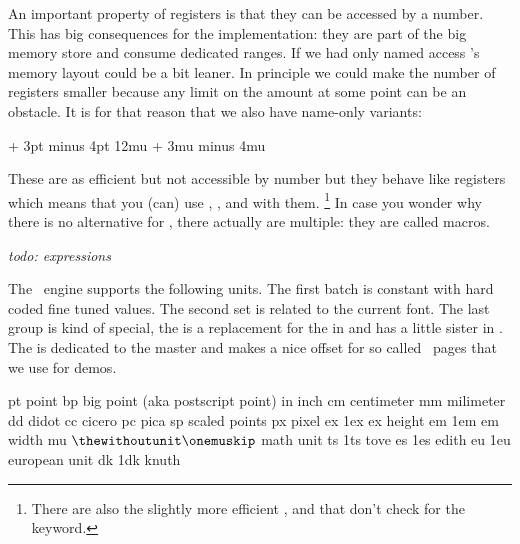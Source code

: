 An important property of registers is that they can be accessed by a number. This
has big consequences for the implementation: they are part of the big memory
store and consume dedicated ranges. If we had only named access \TEX's memory
layout could be a bit leaner. In principle we could make the number of registers
smaller because any limit on the amount at some point can be an obstacle. It is
for that reason that we also have name-only variants:

\starttyping[option=TEX]
\dimensiondef \MyDimenA   12pt
\integerdef   {}
\gluespecdef  \MyGlueA    12pt + 3pt minus 4pt
\mugluespecdef\MyMuA      12mu + 3mu minus 4mu
\stoptyping

These are as efficient but not accessible by number but they behave like
registers which means that you (can) use \type {\the}, \type {\advance}, \type
{\multiply} and \type {\divide} with them. \footnote {There are also the slightly
more efficient \type {\advanceby}, \type {\multiplyby} and \type {\divideby} that
don't check for the  keyword.} In case you wonder why there is no
alternative for \type {\toksdef}, there actually are multiple: they are called
macros.

{\em todo: expressions}

\stopsectionlevel

\startsectionlevel[title=Units]

The \LUAMETATEX\ engine supports the following units. The first batch is constant
with hard coded fine tuned values. The second set is related to the current font.
The last group is kind of special, the  is a replacement for the \type
{in} and has a little sister in . The  is dedicated to the
master and makes a nice offset for so called \TEX\ pages that we use for demos.

\starttabulate[|Tl|Tr|l|]
\FL
\NC pt \NC \thewithoutunit{} \NC point \NC \NR
\NC bp \NC \thewithoutunit{} \NC big point (aka postscript point) \NC \NR
\NC in \NC \thewithoutunit{} \NC inch \NC \NR
\NC cm \NC \thewithoutunit{} \NC centimeter \NC \NR
\NC mm \NC \thewithoutunit{} \NC milimeter \NC \NR
\NC dd \NC \thewithoutunit{} \NC didot \NC \NR
\NC cc \NC \thewithoutunit{} \NC cicero \NC \NR
\NC pc \NC \thewithoutunit{} \NC pica \NC \NR
\NC sp \NC \thewithoutunit{} \NC scaled points \NC \NR
\NC px \NC \thewithoutunit{} \NC pixel \NC \NR
\ML
\NC ex \NC \thewithoutunit\dimexpr1ex \NC ex height \NC \NR
\NC em \NC \thewithoutunit\dimexpr1em \NC em width \NC \NR
\NC mu \NC $\tt\thewithoutunit\onemuskip$ \NC math unit \NC \NR
\ML
\NC ts \NC \thewithoutunit\dimexpr1ts \NC tove \NC \NR
\NC es \NC \thewithoutunit\dimexpr1es \NC edith \NC \NR
\NC eu \NC \thewithoutunit\dimexpr1eu \NC european unit \NC \NR
\NC dk \NC \thewithoutunit\dimexpr1dk \NC knuth \NC \NR
\LL
\stoptabulate

